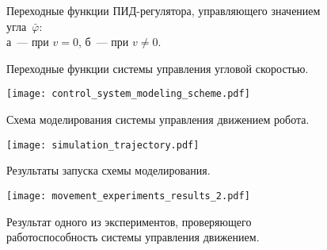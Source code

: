 \begin{figure}[h!]
    \caption{Переходные функции ПИД-регулятора, управляющего значением угла~$\bar{\varphi}$:\\ а~--- при $v = 0$, б~--- при $v \ne 0$.}
    \label{img_phi_pid}
\end{figure}

\begin{figure}[h!]
    \vspace{0.0cm}
    \caption{Переходные функции системы управления угловой скоростью.}
    \label{img_angular_speed_feedworward}
\end{figure}

\begin{figure}[h!]
    \centering
    \texttt{[image: control\_system\_modeling\_scheme.pdf]}
    \vspace{0.0cm}
    \caption{Схема моделирования системы управления движением робота.}
    \label{img_control_system_modeling_scheme}
\end{figure}

\vspace{-1.2cm}

\begin{figure}[h!]
    \centering
    \texttt{[image: simulation\_trajectory.pdf]}
    \vspace{0.0cm}
    \caption{Результаты запуска схемы моделирования.}
    \label{img_simulation_trajectory}
\end{figure}

\vspace{-1.2cm}

\begin{figure}[h!]
    \centering
    \texttt{[image: movement\_experiments\_results\_2.pdf]}
    \vspace{0.0cm}
    \caption{Результат одного из экспериментов, проверяющего работоспособность системы управления движением.}
    \label{img_movement_experiments_results}
\end{figure}

\newpage \mbox{} \newpage \mbox{} \newpage \mbox{} \newpage \mbox{} \newpage